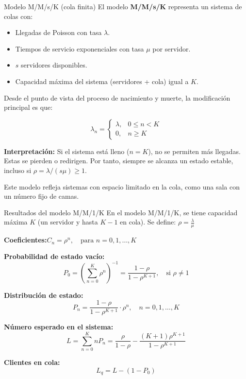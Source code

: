 \documentclass{beamer}
\begin{document}
\begin{frame}{Modelo M/M/s/K (cola finita)}
\justifying
El modelo \textbf{M/M/s/K} representa un sistema de colas con:

\begin{itemize}
    \item Llegadas de Poisson con tasa $\lambda$.
    \item Tiempos de servicio exponenciales con tasa $\mu$ por servidor.
    \item $s$ servidores disponibles.
    \item Capacidad máxima del sistema (servidores + cola) igual a $K$.
\end{itemize}

\medskip
Desde el punto de vista del proceso de nacimiento y muerte, la modificación principal es que:

\[
\lambda_n = 
\begin{cases}
\lambda, & 0 \leq n < K \\
0, & n \geq K
\end{cases}
\]

\medskip
\textbf{Interpretación:} Si el sistema está lleno ($n = K$), no se permiten más llegadas. Estas se pierden o redirigen. Por tanto, siempre se alcanza un estado estable, incluso si $\rho = \lambda/(s\mu) \geq 1$.

\medskip
Este modelo refleja sistemas con espacio limitado en la cola, como una sala con un número fijo de camas.
\end{frame}

\begin{frame}{Resultados del modelo M/M/1/K}
\justifying
En el modelo M/M/1/K, se tiene capacidad máxima $K$ (un servidor y hasta $K - 1$ en cola). Se define: \( \rho = \frac{\lambda}{\mu} \)

\textbf{Coeficientes:}\(C_n = \rho^n, \quad \text{para } n = 0, 1, \dots, K\)

\textbf{Probabilidad de estado vacío:}
\[
P_0 = \left( \sum_{n=0}^{K} \rho^n \right)^{-1} = \frac{1 - \rho}{1 - \rho^{K+1}}, \quad \text{si } \rho \neq 1
\]

\textbf{Distribución de estado:}
\[
P_n = \frac{1 - \rho}{1 - \rho^{K+1}} \cdot \rho^n, \quad n = 0, 1, \dots, K
\]

\textbf{Número esperado en el sistema:}
\[
L = \sum_{n=0}^{K} n P_n
= \frac{\rho}{1 - \rho} - \frac{(K + 1)\rho^{K+1}}{1 - \rho^{K+1}}
\]

\textbf{Clientes en cola:}
\[
L_q = L - (1 - P_0)
\]
\end{frame}
\end{document}
